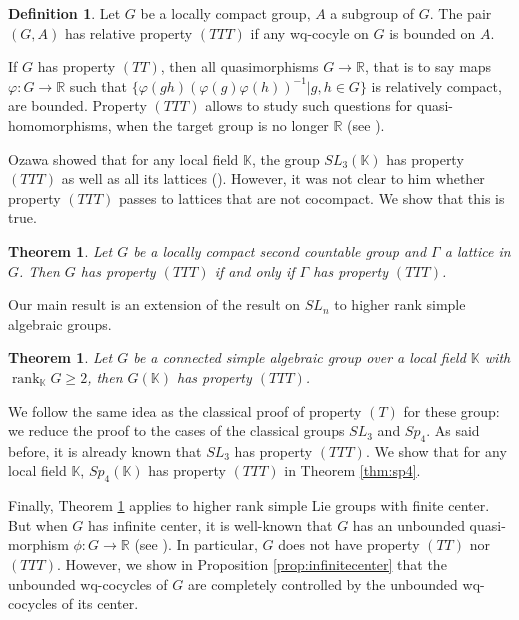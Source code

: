 \documentclass{article}
\newcounter{NoMain}
\newtheorem{mainthm}[NoMain]{Theorem}
\theoremstyle{definition}
\newtheorem{definition}[theorem]{Definition}
\theoremstyle{remark}
\numberwithin{equation}{section}
\newcommand{\R}{\mathbb{R}}
\newcommand{\K}{\mathbb{K}}
\DeclareMathOperator{\rank}{rank}
\begin{document}
\begin{definition}
    Let $G$ be a locally compact group, $A$ a subgroup of $G$. The pair $(G,A)$ has relative property $(TTT)$ if any wq-cocyle on $G$ is bounded on $A$.
\end{definition}

If $G$ has property $(TT)$, then all quasimorphisms $G\to \R$, that is to say maps $\varphi:G\to \R$ such that $\{\varphi(gh)(\varphi(g)\varphi(h))^{-1} \vert g,h\in G\}$ is relatively compact, are bounded. Property $(TTT)$ allows to study such questions for quasi-homomorphisms, when the target group is no longer $\R$ (see \cite[Thm. A]{Ozawa+2011+89+104}).\medskip

 Ozawa showed that for any local field $\K$, the group $SL_3(\K)$ has property $(TTT)$ as well as all its lattices (\cite[Thm. B]{Ozawa+2011+89+104}). However, it was not clear to him whether property $(TTT)$ passes to lattices that are not cocompact. We show that this is true.

 \begin{mainthm}\label{thm:latticesTTT}
     Let $G$ be a locally compact second countable group and $\Gamma$ a lattice in $G$. Then $G$ has property $(TTT)$ if and only if $\Gamma$ has property $(TTT)$.
 \end{mainthm}

Our main result is an extension of the result on $SL_n$ to higher rank simple algebraic groups.
\begin{mainthm}\label{thm:mainthm}
    Let $G$ be a connected simple algebraic group over a local field $\K$ with $\rank_\K G \geq 2$, then $G\left(\K\right)$ has property $(TTT)$.
\end{mainthm}

We follow the same idea as the classical proof of property $(T)$ for these group: we reduce the proof to the cases of the classical groups $SL_3$ and $Sp_4$. As said before, it is already known that $SL_3$ has property $(TTT)$. We show that for any local field $\K$, $Sp_4(\K)$ has property $(TTT)$ in Theorem \ref{thm:sp4}.\medskip

Finally, Theorem \ref{thm:mainthm} applies to higher rank simple Lie groups with finite center. But when $G$ has infinite center, it is well-known that $G$ has an unbounded quasi-morphism $\phi:G\to \R$ (see \cite[Prop. 6]{Barge1992}). In particular, $G$ does not have property $(TT)$ nor $(TTT)$. However, we show in Proposition \ref{prop:infinitecenter} that the unbounded wq-cocycles of $G$ are completely controlled by the unbounded wq-cocycles of its center.
\end{document}
